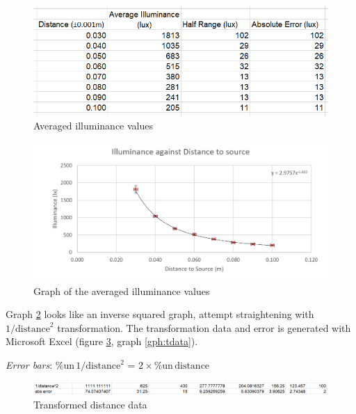 \documentclass[a4paper,12pt]{article}
\newcommand{\relun}{\% \text{un}\,}
\begin{document}
\begin{figure}
    \centering
    \includegraphics[scale=0.6]{assets/averagedata.png}
    \caption{Averaged illuminance values}
    \label{fig:average}
\end{figure}

\begin{figure}
    \centering
    \includegraphics[width=\textwidth]{assets/averagegraph.png}
    \caption{Graph of the averaged illuminance values}
    \label{gph:average}
\end{figure}

Graph \ref{gph:average} looks like an inverse squared graph, attempt straightening with $1/{\text{distance}}^2$ transformation. The transformation data and error is generated with Microsoft Excel (figure \ref{fig:tdata}, graph \ref{gph:tdata}).

\textit{Error bars}: $\relun 1/{\text{distance}}^2$ = $2 \times \relun \text{distance}$

\begin{figure}
    \centering
    \includegraphics[width=\textwidth]{assets/transformdata.png}
    \caption{Transformed distance data}
    \label{fig:tdata}
\end{figure}
\end{document}
